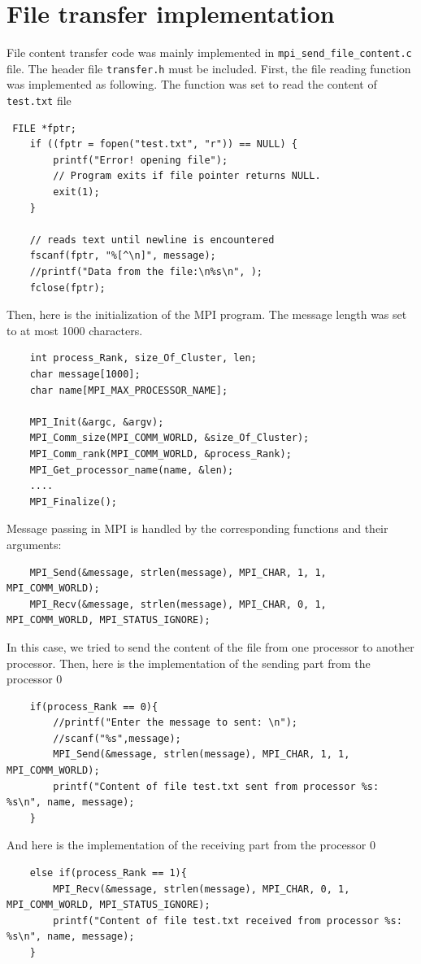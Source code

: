 \documentclass[times, 10pt]{thesisMDH}
\begin{document}
\section{File transfer implementation}
File content transfer code was mainly implemented in \texttt{mpi\_send\_file\_content.c} file. The header file \texttt{transfer.h} must be included.
First, the file reading function was implemented as following. The function was set to read the content of \texttt{test.txt} file
\begin{lstlisting}
 FILE *fptr;
    if ((fptr = fopen("test.txt", "r")) == NULL) {
        printf("Error! opening file");
        // Program exits if file pointer returns NULL.
        exit(1);
    }

    // reads text until newline is encountered
    fscanf(fptr, "%[^\n]", message);
    //printf("Data from the file:\n%s\n", );
    fclose(fptr);
\end{lstlisting}
Then, here is the initialization of the MPI program. The message length was set to at most 1000 characters.
\begin{lstlisting}
    int process_Rank, size_Of_Cluster, len;
    char message[1000];
    char name[MPI_MAX_PROCESSOR_NAME];

    MPI_Init(&argc, &argv);
    MPI_Comm_size(MPI_COMM_WORLD, &size_Of_Cluster);
    MPI_Comm_rank(MPI_COMM_WORLD, &process_Rank);
    MPI_Get_processor_name(name, &len);
    ....
    MPI_Finalize();
\end{lstlisting}
Message passing in MPI is handled by the corresponding functions and their arguments:
\begin{lstlisting}
    MPI_Send(&message, strlen(message), MPI_CHAR, 1, 1, MPI_COMM_WORLD);
    MPI_Recv(&message, strlen(message), MPI_CHAR, 0, 1, MPI_COMM_WORLD, MPI_STATUS_IGNORE);
\end{lstlisting}
In this case, we tried to send the content of the file from one processor to another processor. Then, here is the implementation of the sending part from the processor 0
\begin{lstlisting}
    if(process_Rank == 0){
    	//printf("Enter the message to sent: \n");
    	//scanf("%s",message);
        MPI_Send(&message, strlen(message), MPI_CHAR, 1, 1, MPI_COMM_WORLD);
        printf("Content of file test.txt sent from processor %s: %s\n", name, message);
    }
\end{lstlisting}
And here is the implementation of the receiving part from the processor 0
\begin{lstlisting}
    else if(process_Rank == 1){
        MPI_Recv(&message, strlen(message), MPI_CHAR, 0, 1, MPI_COMM_WORLD, MPI_STATUS_IGNORE);
        printf("Content of file test.txt received from processor %s: %s\n", name, message);
    }
\end{lstlisting}
\end{document}
